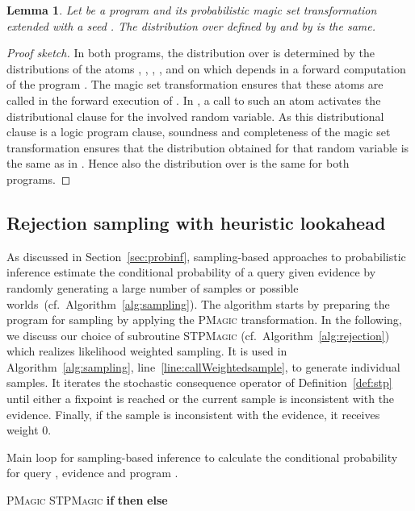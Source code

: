 \documentclass{tlp}
\newtheorem{lemma}{Lemma}
\begin{document}
\begin{lemma}
 Let  be a program and  its probabilistic
  magic set transformation extended with a seed .  The
  distribution over  defined by  and by  is
  the same.
\end{lemma}

\begin{proof}[Proof sketch]
  In both programs, the distribution over  is determined by the
  distributions of the atoms ,
  , , , and
   on which  depends in a forward computation of
  the program . The magic set transformation ensures that these
  atoms are called in the forward execution of .
  In , a call to such an atom activates the
  distributional clause for the involved random variable. As this
  distributional clause is a logic program clause, soundness and
  completeness of the magic set transformation ensures that the
  distribution obtained for that random variable is the same as in
  .  Hence also the distribution over  is the same for both
  programs.
\end{proof}


\subsection{Rejection sampling with heuristic lookahead}

As discussed in Section~\ref{sec:probinf}, sampling-based approaches
to probabilistic inference estimate the conditional probability
 of a query  given evidence  by randomly generating a
large number of samples or possible
worlds~(cf.~Algorithm~\ref{alg:sampling}). The algorithm starts by
preparing the program  for sampling by applying the \textsc{PMagic}
transformation.  In the following, we discuss our choice of subroutine
\textsc{STPMagic} (cf.~Algorithm~\ref{alg:rejection}) which realizes
likelihood weighted sampling.  It is used in
Algorithm~\ref{alg:sampling}, line~\ref{line:callWeightedsample}, to
generate individual samples. It iterates the stochastic consequence
operator of Definition~\ref{def:stp} until either a fixpoint is
reached or the current sample is inconsistent with the
evidence. Finally, if the sample is inconsistent with the evidence, it
receives weight 0.

\begin{algorithm}[t]
  \caption{Main loop for sampling-based inference to calculate the
    conditional probability  for query , evidence  and
    program . }
  \label{alg:sampling}
\begin{algorithmic}[1]
\State \textsc{PMagic}
\State  \hspace{1cm} 
\State \textsc{STPMagic}\label{line:callWeightedsample}
\State \textbf{if}  \textbf{then}  
\textbf{else}   
\EndWhile
\State \Return 
\EndFunction
\end{algorithmic}
\end{algorithm}
\end{document}
